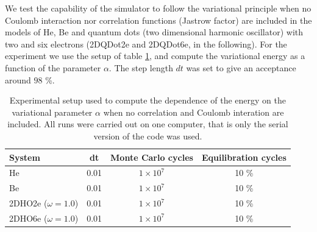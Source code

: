We test the capability of the simulator to follow the variational principle when no Coulomb interaction nor correlation functions (Jastrow factor) are included in the models of He, Be and  quantum dots (two dimensional harmonic oscillator) with two and six electrons (2DQDot2e and 2DQDot6e, in the following). For the experiment we use the setup of table \ref{expSetUpAlpha}, and compute the variational energy as a function of the parameter $\alpha$. The step length $dt$ was set to give an acceptance around $98$ \%.\\

\begin{table}
\centering
\begin{tabular}{lccc}
\toprule[1pt]
\textbf{System} & \textbf{dt} & \textbf{Monte Carlo cycles} & \textbf{Equilibration cycles} \\
\midrule[1pt]
He  										&  0.01 		&   $1\times10^7$ & 10 \% \\
Be  										&  0.01 	&   $1\times10^7$ & 10 \%	\\
2DHO2e ($\omega=1.0$)		&  0.01 	&   $1\times10^7$ & 10 \%	\\
2DHO6e ($\omega = 1.0$)	&  0.01  	& 	$1\times10^7$ & 10 \% \\
\bottomrule[1pt]
\end{tabular}\caption{Experimental setup used to compute the dependence of the energy on the variational parameter $\alpha$ when no correlation and Coulomb interation are included. All runs were carried out on one computer, that is only the serial version of the code was used.}
\label{expSetUpAlpha}
\end{table}


